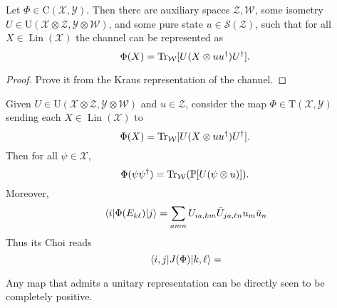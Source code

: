 \documentclass[12pt]{report}
\newcommand{\PP}{\mathbb{P}}
\newcommand{\calY}{{\mathcal{Y}}}
\newcommand{\calS}{{\mathcal{S}}}
\newcommand{\calW}{{\mathcal{W}}}
\newcommand{\calX}{{\mathcal{X}}}
\newcommand{\calZ}{{\mathcal{Z}}}
\newcommand{\rmC}{{\mathrm{C}}}
\newcommand{\rmT}{{\mathrm{T}}}
\newcommand{\rmU}{{\mathrm{U}}}
\DeclareMathOperator{\Lin}{Lin}
\begin{document}
\begin{prop}\label{prop:CPTP_unitary_representation}
	Let $\Phi\in\rmC(\calX,\calY)$. Then there are auxiliary spaces $\calZ,\calW$, some isometry $U\in\rmU(\calX\otimes\calZ,\calY\otimes\calW)$, and some pure state $u\in\calS(\calZ)$, such that for all $X\in\Lin(\calX)$ the channel can be represented as
	\begin{equation}
		\Phi(X) = \Tr_\calW[U(X\otimes uu^\dagger) U^\dagger ].
	\end{equation}
\end{prop}
\begin{proof}
	Prove it from the Kraus representation of the channel.
\end{proof}

\begin{prop}
	Given $U\in\rmU(\calX\otimes\calZ,\calY\otimes\calW)$ and $u\in\calZ$, consider the map $\Phi\in\rmT(\calX,\calY)$ sending each $X\in\Lin(\calX)$ to
	\begin{equation}
		\Phi(X) = \Tr_\calW[U(X\otimes uu^\dagger)U^\dagger].
	\end{equation}
	Then for all $\psi\in\calX$,
	\begin{equation}
		\Phi(\psi\psi^\dagger) = \Tr_\calW(\PP[U(\psi\otimes u)]).
	\end{equation}
	Moreover,
	\begin{equation}
		\mel{i}{\Phi(E_{k\ell})}{j}
		= \sum_{amn}
		U_{ia,km} \bar U_{ja,\ell n} u_m \bar u_n
	\end{equation}
	Thus its Choi reads
	\begin{equation}
		\mel{i,j}{J(\Phi)}{k,\ell}
		= 
	\end{equation}
\end{prop}

Any map that admits a unitary representation can be directly seen to be completely positive.
\end{document}
